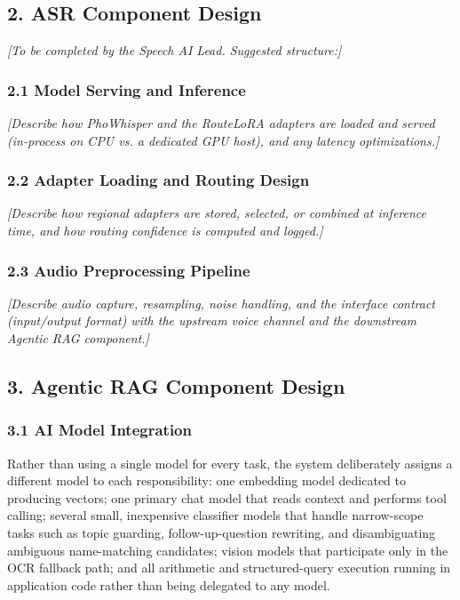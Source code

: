 \documentclass[11pt,a4paper]{article}
\newcommand{\guidance}[1]{%
  {\color{guidanceblue}\itshape [#1]\par}%
}
\begin{document}
\subsection{2. ASR Component Design}
\guidance{To be completed by the Speech AI Lead. Suggested structure:}

\subsubsection{2.1 Model Serving and Inference}
\guidance{Describe how PhoWhisper and the RouteLoRA adapters are loaded and
served (in-process on CPU vs. a dedicated GPU host), and any latency
optimizations.}

\subsubsection{2.2 Adapter Loading and Routing Design}
\guidance{Describe how regional adapters are stored, selected, or combined
at inference time, and how routing confidence is computed and logged.}

\subsubsection{2.3 Audio Preprocessing Pipeline}
\guidance{Describe audio capture, resampling, noise handling, and the
interface contract (input/output format) with the upstream voice channel and
the downstream Agentic RAG component.}

\subsection{3. Agentic RAG Component Design}

\subsubsection{3.1 AI Model Integration}

Rather than using a single model for every task, the system deliberately
assigns a different model to each responsibility: one embedding model
dedicated to producing vectors; one primary chat model that reads context and
performs tool calling; several small, inexpensive classifier models that
handle narrow-scope tasks such as topic guarding, follow-up-question
rewriting, and disambiguating ambiguous name-matching candidates; vision
models that participate only in the OCR fallback path; and all arithmetic
and structured-query execution running in application code rather than being
delegated to any model.
\end{document}
